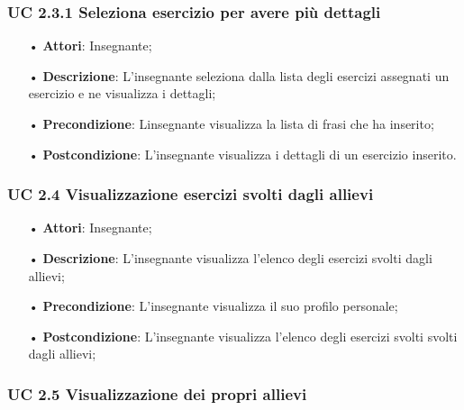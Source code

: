 \subsubsection{UC 2.3.1 Seleziona esercizio per avere più dettagli}
\begin{itemize}
	\item[•] \textbf{Attori}: Insegnante;
	\item[•] \textbf{Descrizione}: L’insegnante seleziona dalla lista degli esercizi assegnati un esercizio e ne visualizza i dettagli;
	\item[•] \textbf{Precondizione}: Linsegnante visualizza la lista di frasi che ha inserito;
	\item[•] \textbf{Postcondizione}: L’insegnante visualizza i dettagli di un esercizio inserito.
\end{itemize}



\subsubsection{UC 2.4 Visualizzazione esercizi svolti dagli allievi}
\begin{itemize}
	\item[•] \textbf{Attori}: Insegnante;
	\item[•] \textbf{Descrizione}:  L’insegnante visualizza l’elenco degli esercizi svolti dagli allievi;
	\item[•] \textbf{Precondizione}:  L’insegnante visualizza il suo profilo personale;

	\item[•] \textbf{Postcondizione}: L’insegnante visualizza l'elenco degli esercizi svolti svolti dagli allievi; 	
\end{itemize}

\subsubsection{UC 2.5 Visualizzazione dei propri allievi}


